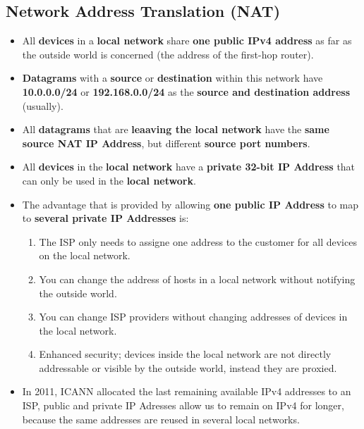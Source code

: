 \documentclass{article}
\begin{document}
    \subsection*{Network Address Translation (NAT)}
    \begin{itemize}
        \item All \textbf{devices} in a \textbf{local network} share \textbf{one public IPv4 address} as far as the outside world is concerned (the address of the first-hop router).
        \item \textbf{Datagrams} with a \textbf{source} or \textbf{destination} within this network have \textbf{10.0.0.0/24} or \textbf{192.168.0.0/24} as the \textbf{source and destination address} (usually).
        \item All \textbf{datagrams} that are \textbf{leaaving the local network} have the \textbf{same source NAT IP Address}, but different \textbf{source port numbers}.
        \item All \textbf{devices} in the \textbf{local network} have a \textbf{private 32-bit IP Address} that can only be used in the \textbf{local network}.
        \item The advantage that is provided by allowing \textbf{one public IP Address} to map to \textbf{several private IP Addresses} is:
        \begin{enumerate}
            \item The ISP only needs to assigne one address to the customer for all devices on the local network.
            \item You can change the address of hosts in a local network without notifying the outside world.
            \item You can change ISP providers without changing addresses of devices in the local network.
            \item Enhanced security; devices inside the local network are not directly addressable or visible by the outside world, instead they are proxied.
        \end{enumerate}
        \item In 2011, ICANN allocated the last remaining available IPv4 addresses to an ISP, public and private IP Adresses allow us to remain on IPv4 for longer, because the same addresses are reused in several local networks.
    \end{itemize}
\end{document}

